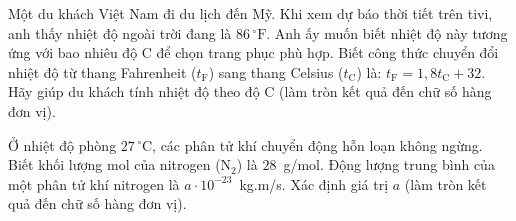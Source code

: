 	\begin{ex}%
		Một du khách Việt Nam đi du lịch đến Mỹ. Khi xem dự báo thời tiết trên tivi, anh thấy nhiệt độ ngoài trời đang là $86\,^\circ\text{F}$. Anh ấy muốn biết nhiệt độ này tương ứng với bao nhiêu độ C để chọn trang phục phù hợp. Biết công thức chuyển đổi nhiệt độ từ thang Fahrenheit ($t_\text{F}$) sang thang Celsius ($t_\text{C}$) là: $t_\text{F}=1{,}8t_\text{C}+32$. Hãy giúp du khách tính nhiệt độ theo độ C (làm tròn kết quả đến chữ số hàng đơn vị).
		\par
	\end{ex}

	\begin{ex}%
		Ở nhiệt độ phòng $27\,^\circ\text{C}$, các phân tử khí chuyển động hỗn loạn không ngừng. Biết khối lượng mol của nitrogen ($\text{N}_2$) là $28$~g/mol. Động lượng trung bình của một phân tử khí nitrogen là $a\cdot 10^{-23}$~kg.m/s. Xác định giá trị $a$ (làm tròn kết quả đến chữ số hàng đơn vị).
		\par
	\end{ex}

